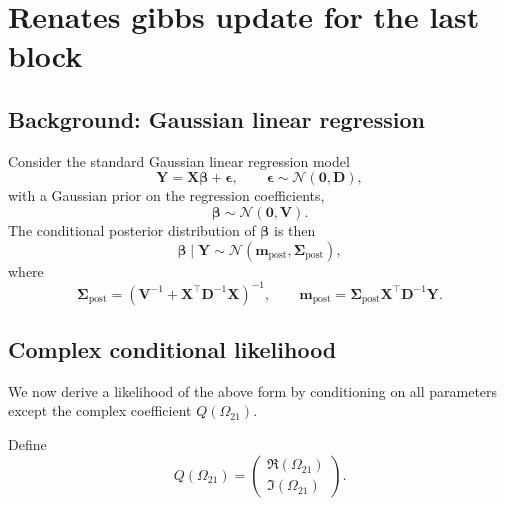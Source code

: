 




\section{Renates gibbs update for the last block}


\subsection{Background: Gaussian linear regression}

Consider the standard Gaussian linear regression model
\begin{equation}
\mathbf{Y} = \mathbf{X}\boldsymbol{\beta} + \boldsymbol{\epsilon},
\qquad
\boldsymbol{\epsilon} \sim \mathcal{N}(\mathbf{0}, \mathbf{D}),
\end{equation}
with a Gaussian prior on the regression coefficients,
\begin{equation}
\boldsymbol{\beta} \sim \mathcal{N}(\mathbf{0}, \mathbf{V}).
\end{equation}
The conditional posterior distribution of $\boldsymbol{\beta}$ is then
\begin{equation}
\boldsymbol{\beta} \mid \mathbf{Y}
\sim
\mathcal{N}(\mathbf{m}_{\mathrm{post}}, \boldsymbol{\Sigma}_{\mathrm{post}}),
\end{equation}
where
\begin{equation}
\boldsymbol{\Sigma}_{\mathrm{post}}
=
\left(
\mathbf{V}^{-1} + \mathbf{X}^{\top}\mathbf{D}^{-1}\mathbf{X}
\right)^{-1},
\qquad
\mathbf{m}_{\mathrm{post}}
=
\boldsymbol{\Sigma}_{\mathrm{post}}
\mathbf{X}^{\top}\mathbf{D}^{-1}\mathbf{Y}.
\end{equation}

\subsection{Complex conditional likelihood}

We now derive a likelihood of the above form by conditioning on all
parameters except the complex coefficient $Q(\Omega_{21})$.

Define
\begin{equation}
Q(\Omega_{21})
=
\begin{pmatrix}
\Re(\Omega_{21}) \\
\Im(\Omega_{21})
\end{pmatrix}.
\end{equation}

